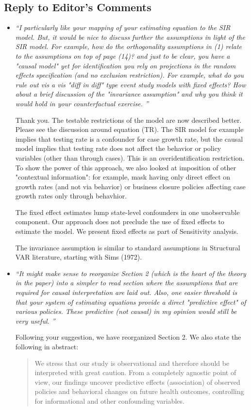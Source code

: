 \documentclass[11pt]{article}
\begin{document}
\subsection*{Reply to Editor's Comments}
\begin{itemize}

\item   \textit{``I particularly like your mapping of your estimating equation to the SIR model. But, it would be nice to discuss further the assumptions in light of the SIR model. For example, how do the orthogonality assumptions in (1) relate to the assumptions on top of page (14)? and just to be clear, you have a "causal model" yet for identification you rely on projections in the random effects specification (and no exclusion restriction). For example, what do you rule out vis a vis "diff in diff" type event study models with fixed effects? How about a brief discussion of the "invariance assumption" and why you think it would hold in your counterfactual exercise. ''}

Thank you. The testable restrictions of the model are now described better.  Please see the discussion around equation (TR). The SIR model
for example implies that testing rate is a confounder for case growth rate, but the causal model implies  that testing rate
does not affect the behavior or policy variables (other than through cases). This is an overidentification restriction.
To show the power of this approach, we also looked at imposition of other "contextual information": for example, mask
having only direct effect on growth rates (and not via behavior) or business closure policies affecting case growth rates
only through behavhior.

The fixed effect estimates lump state-level confounders in one unobservable component.  Our approach does not preclude
the use of fixed effects to estimate the model. We present fixed effects as part of Sensitivity analysis.

The invariance assumption is similar to standard assumptions in Structural VAR literature, starting with Sims (1972).
 

\item   \textit{``It might make sense to reorganize Section 2 (which is the heart of the theory in the paper) into a simpler to read section  where the assumptions that are required for causal interpretation are laid out. Also, one easier threshold is that your system of estimating equations provide a direct "predictive effect" of various policies. These predictive (not causal) in my opinion would still be very useful. ''}

Following your suggestion, we have reorganized Section 2. 
 We also state the following in abstract:
 \begin{quote}
 We stress that our study is observational and therefore should be interpreted with great caution. 
 From a completely agnostic point of view,
our findings uncover predictive effects (association) of observed policies and behavioral changes  on future health outcomes,
 controlling for informational and other confounding variables.
\end{quote}

\end{itemize}
\end{document}
